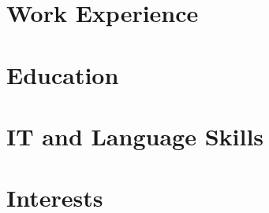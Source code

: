 




\maketitle
\vspace{-1cm}

\section{Work Experience}
	

\section{Education}
	
	
\section{IT and Language Skills}
	

\section{Interests}
	

%	


